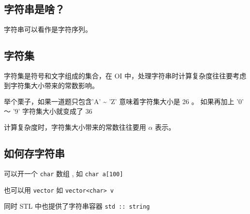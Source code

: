 
\subsection{字符串是啥？}

字符串可以看作是字符序列。

\subsection{字符集}

字符集是符号和文字组成的集合，在 OI 中，处理字符串时计算复杂度往往要考虑到字符集大小带来的常数影响。

举个栗子，如果一道题只包含'A' \textasciitilde{} 'Z' 意味着字符集大小是 26 。 如果再加上 '0' ～ '9' 字符集大小就变成了 36

计算复杂度时，字符集大小带来的常数往往要用 $\alpha$ 表示。

\subsection{如何存字符串}

可以开一个 \texttt{char} 数组 , 如 \texttt{char a[100]}

也可以用 \texttt{vector} 如  \texttt{vector<char> v}

同时 STL 中也提供了字符串容器 \texttt{std :: string} 

